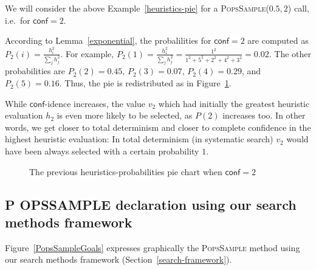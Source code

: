 \documentclass{ws-ijait}
\begin{document}
\begin{example}
  \label{heuristics-pie2}
  We will consider the above Example~\ref{heuristics-pie}
  for a \textsc{PopsSample}($0.5, 2$) call, i.e.\ for
  $\mathsf{conf} = 2$.

  According to Lemma~\ref{exponential}, the probalilities
  for $\mathsf{conf} = 2$ are computed as $P_2(i) =
  \frac{h_i^2}{\sum_j h_j^2}$. For example, $P_2(1) =
  \frac{h_1^2}{\sum_j h_j^2} = \frac{1^2}{1^2 + 5^2 + 2^2 +
  4^2 + 3^2} = 0.02$. The other probabilities are $P_2(2) =
  0.45$, $P_2(3) = 0.07$, $P_2(4) = 0.29$, and $P_2(5) =
  0.16$. Thus, the pie is redistributed as in
  Figure~\ref{piechart2}.

  While $\mathsf{conf}$-idence increases, the value $v_2$
  which had initially the greatest heuristic evaluation
  $h_2$ is even more likely to be selected, as $P(2)$
  increases too. In other words, we get closer to total
  determinism and closer to complete confidence in the
  highest heuristic evaluation: In total determinism (in
  systematic search) $v_2$ would have been always selected
  with a certain probability $1$.
\end{example}

\begin{figure}
  \centering
  
  \caption{The previous heuristics-probabilities pie chart
           when $\mathsf{conf} = 2$\label{piechart2}}
\end{figure}

\newcommand{\PoPS}{\textbf{\normalsize P\footnotesize
                           O\normalsize PS}}
\newcommand{\PopsSample}{\textbf{\normalsize P\footnotesize
                       OPS\normalsize S\footnotesize AMPLE}}

\subsection{\PopsSample{} declaration using our search
            methods framework}

Figure~\ref{PopsSampleGoals} expresses graphically the
\textsc{PopsSample} method using our search methods
framework (Section~\ref{search-framework}).
\end{document}
